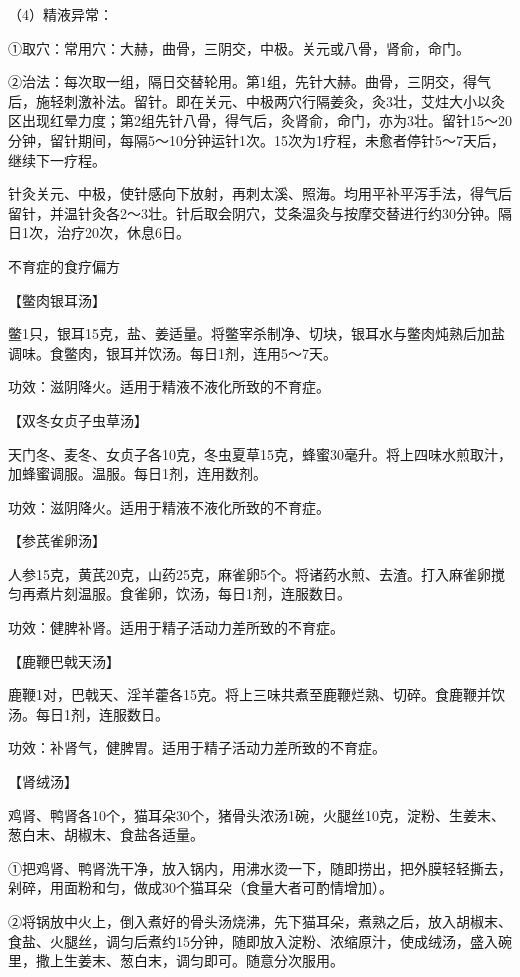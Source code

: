 \documentclass[12pt,UTF8]{ctexbook}
\begin{document}
（4）精液异常：

①取穴：常用穴：大赫，曲骨，三阴交，中极。关元或八骨，肾俞，命门。

②治法：每次取一组，隔日交替轮用。第1组，先针大赫。曲骨，三阴交，得气后，施轻刺激补法。留针。即在关元、中极两穴行隔姜灸，灸3壮，艾炷大小以灸区出现红晕力度；第2组先针八骨，得气后，灸肾俞，命门，亦为3壮。留针15～20分钟，留针期间，每隔5～10分钟运针1次。15次为1疗程，未愈者停针5～7天后，继续下一疗程。

针灸关元、中极，使针感向下放射，再刺太溪、照海。均用平补平泻手法，得气后留针，并温针灸各2～3壮。针后取会阴穴，艾条温灸与按摩交替进行约30分钟。隔日1次，治疗20次，休息6日。





不育症的食疗偏方


【鳖肉银耳汤】

鳖1只，银耳15克，盐、姜适量。将鳖宰杀制净、切块，银耳水与鳖肉炖熟后加盐调味。食鳖肉，银耳并饮汤。每日1剂，连用5～7天。

功效：滋阴降火。适用于精液不液化所致的不育症。

【双冬女贞子虫草汤】

天门冬、麦冬、女贞子各10克，冬虫夏草15克，蜂蜜30毫升。将上四味水煎取汁，加蜂蜜调服。温服。每日1剂，连用数剂。

功效：滋阴降火。适用于精液不液化所致的不育症。

【参芪雀卵汤】

人参15克，黄芪20克，山药25克，麻雀卵5个。将诸药水煎、去渣。打入麻雀卵搅匀再煮片刻温服。食雀卵，饮汤，每日1剂，连服数日。

功效：健脾补肾。适用于精子活动力差所致的不育症。

【鹿鞭巴戟天汤】

鹿鞭1对，巴戟天、淫羊藿各15克。将上三味共煮至鹿鞭烂熟、切碎。食鹿鞭并饮汤。每日1剂，连服数日。

功效：补肾气，健脾胃。适用于精子活动力差所致的不育症。

【肾绒汤】

鸡肾、鸭肾各10个，猫耳朵30个，猪骨头浓汤1碗，火腿丝10克，淀粉、生姜末、葱白末、胡椒末、食盐各适量。

①把鸡肾、鸭肾洗干净，放入锅内，用沸水烫一下，随即捞出，把外膜轻轻撕去，剁碎，用面粉和匀，做成30个猫耳朵（食量大者可酌情增加）。

②将锅放中火上，倒入煮好的骨头汤烧沸，先下猫耳朵，煮熟之后，放入胡椒末、食盐、火腿丝，调匀后煮约15分钟，随即放入淀粉、浓缩原汁，使成绒汤，盛入碗里，撒上生姜末、葱白末，调匀即可。随意分次服用。
\end{document}

